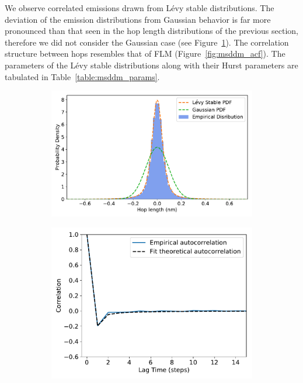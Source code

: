 \documentclass{article}
\begin{document}
  We observe correlated emissions drawn from L\'evy stable distributions.
  The deviation of the emission distributions from Gaussian behavior is far more pronounced
  than that seen in the hop length distributions of the previous section, therefore we 
  did not consider the Gaussian case (see Figure~\ref{fig:gaussian_levy_comparison}).
  The correlation structure between hops resembles that of FLM (Figure~\ref{fig:msddm_acf}).
  The parameters of the L\'evy stable distributions along with their Hurst parameters 
  are tabulated in Table~\ref{table:msddm_params}. 
  \begin{figure}
  \centering
  \begin{subfigure}{0.49\textwidth}
  \includegraphics[width=\textwidth]{gaussian_levy_comparison.pdf}
  \caption{}\label{fig:gaussian_levy_comparison}
  \end{subfigure}
  \begin{subfigure}{0.42\textwidth}
  \includegraphics[width=\textwidth]{msddm_acf.pdf}

\end{subfigure}
\end{figure}
\end{document}
